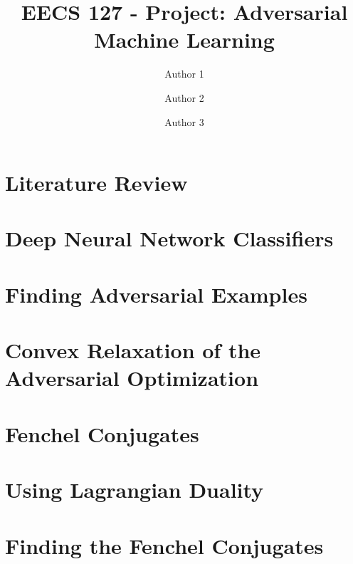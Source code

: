 \documentclass{amsart}
\title{EECS 127 - Project: Adversarial Machine Learning}  %
\author{Author 1}
\author{Author 2}  %
\author{Author 3}  %
\begin{document}
\maketitle

\tableofcontents

\pagebreak

\section{Literature Review}



\pagebreak

\section{Deep Neural Network Classifiers}



\pagebreak

\section{Finding Adversarial Examples}



\pagebreak

\section{Convex Relaxation of the Adversarial Optimization}



\pagebreak

\section{Fenchel Conjugates}



\pagebreak

\section{Using Lagrangian Duality}



\pagebreak

\section{Finding the Fenchel Conjugates}
\end{document}
